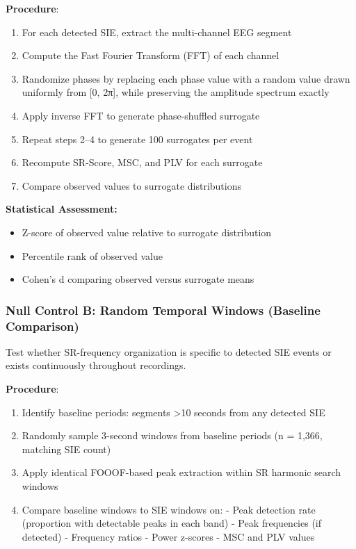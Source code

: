 \documentclass[11pt,a4paper]{article}
\begin{document}
\textbf{Procedure}:
\begin{enumerate}
\item For each detected SIE, extract the multi-channel EEG segment
\item Compute the Fast Fourier Transform (FFT) of each channel
\item Randomize phases by replacing each phase value with a random value drawn uniformly from [0, 2π], while preserving the amplitude spectrum exactly
\item Apply inverse FFT to generate phase-shuffled surrogate
\item Repeat steps 2–4 to generate 100 surrogates per event
\item Recompute SR-Score, MSC, and PLV for each surrogate
\item Compare observed values to surrogate distributions
\end{enumerate}

\textbf{Statistical Assessment:}
\begin{itemize}
\item Z-score of observed value relative to surrogate distribution
\item Percentile rank of observed value
\item Cohen's d comparing observed versus surrogate means
\end{itemize}

\subsubsection{Null Control B: Random Temporal Windows (Baseline Comparison)}
Test whether SR-frequency organization is specific to detected SIE events or exists continuously throughout recordings.

\textbf{Procedure}:
\begin{enumerate}
\item Identify baseline periods: segments >10 seconds from any detected SIE
\item Randomly sample 3-second windows from baseline periods (n = 1,366, matching SIE count)
\item Apply identical FOOOF-based peak extraction within SR harmonic search windows
\item Compare baseline windows to SIE windows on:   - Peak detection rate (proportion with detectable peaks in each band)   - Peak frequencies (if detected)   - Frequency ratios   - Power z-scores   - MSC and PLV values
\end{enumerate}
\end{document}
